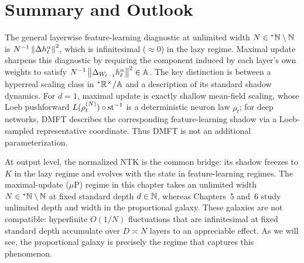 \section{Summary and Outlook}
\label{sec:4.6}

The general layerwise feature-learning diagnostic at unlimited width $N \in {}^*\mathbb{N} \setminus \mathbb{N}$ is $N^{-1}\left\lVert \Delta h_\ell^\alpha \right\rVert^2$, which is infinitesimal ($\approx 0$) in the lazy regime. Maximal update sharpens this diagnostic by requiring the component induced by each layer's own weights to satisfy $N^{-1}\left\lVert \Delta_{W_{\ell-1}} h_\ell^\alpha \right\rVert^2 \in \mathbb{A}$. The key distinction is between a hyperreal scaling class in ${}^*\mathbb{R}^\times / \mathbb{A}$ and a description of its standard shadow dynamics. For $d = 1$, maximal update is exactly shallow mean-field scaling, whose Loeb pushforward $L(\rho_t^{(N)}) \circ \operatorname{st}^{-1}$ is a deterministic neuron law $\rho_t$; for deep networks, DMFT describes the corresponding feature-learning shadow via a Loeb-sampled representative coordinate. Thus DMFT is not an additional parameterization.

At output level, the normalized NTK is the common bridge: its shadow freezes to $K$ in the lazy regime and evolves with the state in feature-learning regimes. The maximal-update ($\mu$P) regime in this chapter takes an unlimited width $N \in {}^*\mathbb{N} \setminus \mathbb{N}$ at fixed standard depth $d \in \mathbb{N}$, whereas Chapters~5 and~6 study unlimited depth and width in the proportional galaxy. These galaxies are not compatible: hyperfinite $O(1/N)$ fluctuations that are infinitesimal at fixed standard depth accumulate over $D \asymp N$ layers to an appreciable effect. As we will see, the proportional galaxy is precisely the regime that captures this phenomenon.

